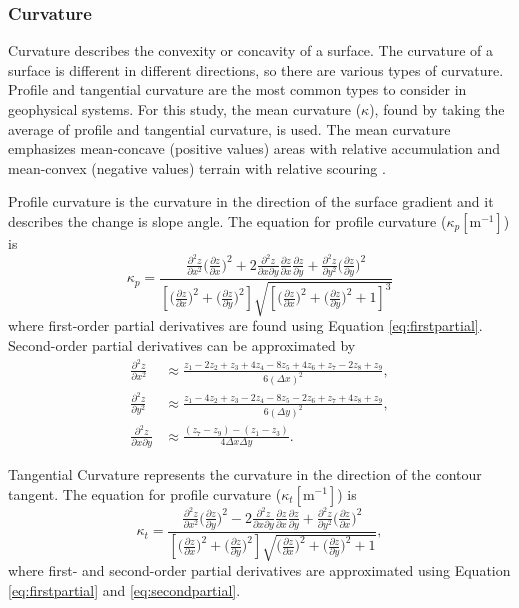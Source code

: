 \documentclass{sfuthesis}
\begin{document}
\subsubsection*{Curvature} 

Curvature describes the convexity or concavity of a surface. The curvature of a surface is different in different directions, so there are various types of curvature. Profile and tangential curvature are the most common types to consider in geophysical systems. For this study, the mean curvature ($\kappa$), found by taking the average of profile and tangential curvature, is used. The mean curvature emphasizes mean-concave (positive values) areas with relative accumulation and mean-convex (negative values) terrain with relative scouring \citep{Olaya2009}.

Profile curvature is the curvature in the direction of the surface gradient and it describes the change is slope angle. The equation for profile curvature ($\kappa_p \left[\mathrm{m}^{-1}\right]$) is \citep{Neteler2008}
\begin{equation} 
\kappa_p = \frac{\frac{\partial^2 z}{\partial x^2} \big(\frac{\partial z}{\partial x}\big)^2 + 2\frac{\partial^2 z}{\partial x \partial y}\frac{\partial z}{\partial x}\frac{\partial z}{\partial y} +  \frac{\partial^2 z}{\partial y^2} \big(\frac{\partial z}{\partial y}\big)^2}{\left[\big( \frac{\partial z}{\partial x} \big) ^2 + \big(\frac{\partial z}{\partial y} \big)^2\right] \sqrt{\left[\big(\frac{\partial z}{\partial x} \big) ^2 + \big( \frac{\partial z}{\partial y}\big) ^2+1\right]^3}}
\end{equation} 
where first-order partial derivatives are found using Equation \ref{eq:firstpartial}. Second-order partial derivatives can be approximated by \citep{Hofierka2009, Neteler2008}
\begin{align}\label{eq:secondpartial}
\frac{\partial^2 z}{\partial x^2} &\approx\frac{z_1-2z_2+z_3+4z_4-8z_5+4z_6+z_7-2z_8+z_9}{6  (\Delta x)^2},\nonumber\\
\frac{\partial^2 z}{\partial y^2} &\approx \frac{z_1-4z_2+z_3-2z_4-8z_5-2z_6+z_7+4z_8+z_9}{6  (\Delta y)^2},\nonumber\\
\frac{\partial^2 z}{\partial x \partial y} &\approx \frac{(z_7-z_9)-(z_1-z_3)}{4  \Delta x \Delta y}.
\end{align}

Tangential Curvature represents the curvature in the direction of the contour tangent. The equation for profile curvature ($\kappa_t \left[\mathrm{m}^{-1}\right]$) is \citep{Neteler2008}
\begin{equation}
\kappa_t = \frac{\frac{\partial^2 z}{\partial x^2} \big(\frac{\partial z}{\partial y}\big)^2 - 2\frac{\partial^2 z}{\partial x \partial y}\frac{\partial z}{\partial x}\frac{\partial z}{\partial y} +  \frac{\partial^2 z}{\partial y^2} \big(\frac{\partial z}{\partial x}\big)^2}{\left[\big( \frac{\partial z}{\partial x} \big) ^2 + \big(\frac{\partial z}{\partial y} \big)^2\right] \sqrt{\big(\frac{\partial z}{\partial x} \big) ^2 + \big( \frac{\partial z}{\partial y}\big) ^2 +1}},
\end{equation} 	
where first- and second-order partial derivatives are approximated using Equation \ref{eq:firstpartial} and \ref{eq:secondpartial}. 
\end{document}
